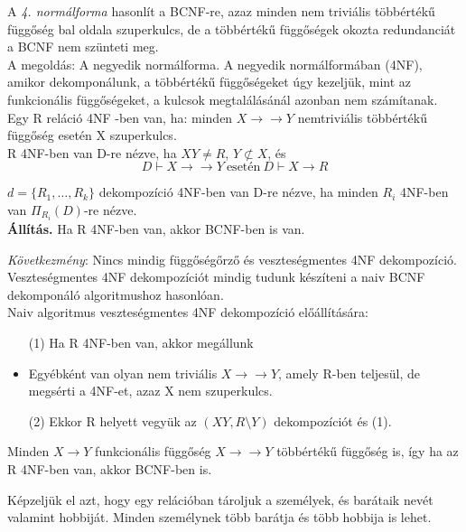 \documentclass[tikz,12pt,margin=0px]{article}
\begin{document}
{    \noindent A \textit{4. normálforma} hasonlít a BCNF-re, azaz minden nem triviális többértékű függőség bal oldala szuperkulcs, de a többértékű függőségek okozta redundanciát a BCNF nem szünteti meg.\\

    \noindent A megoldás: A negyedik normálforma. A negyedik normálformában (4NF), amikor dekomponálunk, a többértékű függőségeket úgy kezeljük, mint az funkcionális függőségeket, a kulcsok megtalálásánál azonban nem számítanak.\\

    \noindent Egy R reláció 4NF -ben van, ha: minden $X \to\to Y$ nemtriviális többértékű függőség esetén X szuperkulcs.\\

	\noindent R 4NF-ben van D-re nézve, ha $XY \neq R$, $Y \not\subset X$, és
    \[
        D \vdash X \to\to Y\ \text{esetén}\ D \vdash X \to R
    \]
	
    \noindent $d=\{R_1, \ldots, R_k\}$ dekompozíció 4NF-ben van D-re nézve, ha minden $R_i$ 4NF-ben van $\Pi_{R_i}(D)$-re nézve.\\

    \noindent \textbf{Állítás.} Ha R 4NF-ben van, akkor BCNF-ben is van.

    \noindent \emph{Következmény}: Nincs mindig függőségőrző és veszteségmentes 4NF dekompozíció.\\

	\noindent Veszteségmentes 4NF dekompozíciót mindig tudunk készíteni a naiv BCNF dekomponáló algoritmushoz hasonlóan. \\

    \noindent Naiv algoritmus veszteségmentes 4NF dekompozíció előállítására:
    \begin{itemize}
        \item[(1)] Ha R 4NF-ben van, akkor megállunk
        \item Egyébként van olyan nem triviális $X \to\to Y$, amely R-ben teljesül, de megsérti a 4NF-et, azaz X nem szuperkulcs.
        \item[(2)] Ekkor R helyett vegyük az $(XY, R \setminus Y)$ dekompozíciót és (1).
    \end{itemize}

    \noindent Minden $X \to Y$ funkcionális függőség $X \to\to Y$ többértékű függőség is, így ha az R 4NF-ben van, akkor BCNF-ben is.

    \noindent Képzeljük el azt, hogy egy relációban tároljuk a személyek, és barátaik nevét valamint hobbiját. Minden személynek több barátja és több hobbija is lehet.\\

}
\end{document}
